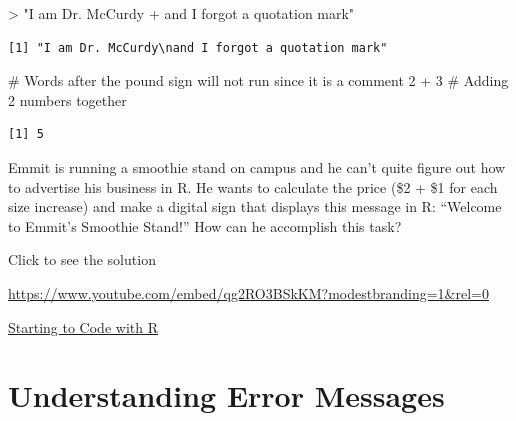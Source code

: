 \documentclass[
  letterpaper,
  DIV=11,
  numbers=noendperiod]{scrreprt}
\newenvironment{Shaded}{\begin{snugshade}}{\end{snugshade}}
\newcommand{\CommentTok}[1]{\textcolor[rgb]{0.37,0.37,0.37}{#1}}
\newcommand{\DecValTok}[1]{\textcolor[rgb]{0.68,0.00,0.00}{#1}}
\newcommand{\SpecialCharTok}[1]{\textcolor[rgb]{0.37,0.37,0.37}{#1}}
\newcommand{\StringTok}[1]{\textcolor[rgb]{0.13,0.47,0.30}{#1}}
\begin{document}
\begin{Shaded}
\begin{Highlighting}[]
\SpecialCharTok{\textgreater{}} \StringTok{"I am Dr. McCurdy}
\StringTok{+ and I forgot a quotation mark"}
\end{Highlighting}
\end{Shaded}

\begin{verbatim}
[1] "I am Dr. McCurdy\nand I forgot a quotation mark"
\end{verbatim}

\begin{Shaded}
\begin{Highlighting}[]
\CommentTok{\# Words after the pound sign will not run since it is a comment}
\DecValTok{2} \SpecialCharTok{+} \DecValTok{3} \CommentTok{\# Adding 2 numbers together}
\end{Highlighting}
\end{Shaded}

\begin{verbatim}
[1] 5
\end{verbatim}

\begin{tcolorbox}[enhanced jigsaw, leftrule=.75mm, arc=.35mm, coltitle=black, rightrule=.15mm, bottomrule=.15mm, toprule=.15mm, left=2mm, colbacktitle=quarto-callout-tip-color!10!white, title=\textcolor{quarto-callout-tip-color}{\faLightbulb}\hspace{0.5em}{Try it Out}, toptitle=1mm, breakable, colframe=quarto-callout-tip-color-frame, bottomtitle=1mm, titlerule=0mm, colback=white, opacityback=0, opacitybacktitle=0.6]

Emmit is running a smoothie stand on campus and he can't quite figure
out how to advertise his business in R. He wants to calculate the price
(\$2 + \$1 for each size increase) and make a digital sign that displays
this message in R: ``Welcome to Emmit's Smoothie Stand!'' How can he
accomplish this task?

Click to see the solution

\url{https://www.youtube.com/embed/qg2RO3BSkKM?modestbranding=1&rel=0}

\end{tcolorbox}

\begin{watch}{}{}
    \href{https://youtu.be/Wf7Qwbr9Nko}{Starting to Code with R}
\end{watch}

\section{Understanding Error
Messages}\label{understanding-error-messages}
\end{document}

